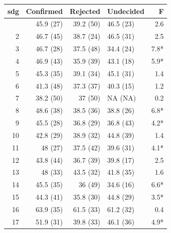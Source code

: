 \begin{table}[t]
\fontsize{12.0pt}{14.4pt}\selectfont
\begin{tabular*}{\linewidth}{@{\extracolsep{\fill}}rrrlr}
\toprule
sdg & Confirmed & Rejected & Undecided & F \\ 
\midrule\addlinespace[2.5pt]
1 & 45.9 (27) & 39.2 (50) & 46.5 (23) & 2.6 \\ 
2 & 46.7 (45) & 38.7 (24) & 46.5 (31) & 2.5 \\ 
3 & 46.7 (28) & 37.5 (48) & 34.4 (24) & 7.8* \\ 
4 & 46.9 (43) & 35.9 (39) & 43.1 (18) & 5.9* \\ 
5 & 45.3 (35) & 39.1 (34) & 45.1 (31) & 1.4 \\ 
6 & 41.3 (48) & 37.3 (37) & 40.3 (15) & 1.2 \\ 
7 & 38.2 (50) & 37 (50) & NA (NA) & 0.2 \\ 
8 & 48.6 (38) & 38.5 (36) & 38.8 (26) & 6.8* \\ 
9 & 45.5 (28) & 36.8 (29) & 36.8 (43) & 4.2* \\ 
10 & 42.8 (29) & 38.9 (32) & 44.8 (39) & 1.4 \\ 
11 & 48 (27) & 37.5 (42) & 39.6 (31) & 4.1* \\ 
12 & 43.8 (44) & 36.7 (39) & 39.8 (17) & 2.5 \\ 
13 & 48 (33) & 43.5 (32) & 41.8 (35) & 1.6 \\ 
14 & 45.5 (35) & 36 (49) & 34.6 (16) & 6.6* \\ 
15 & 44.3 (41) & 35.8 (30) & 44.8 (29) & 3.5* \\ 
16 & 63.9 (35) & 61.5 (33) & 61.2 (32) & 0.4 \\ 
17 & 51.9 (31) & 39.8 (33) & 46.1 (36) & 4.9* \\ 
\bottomrule
\end{tabular*}
\end{table}

